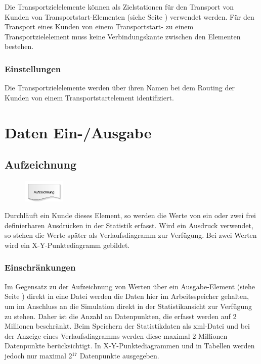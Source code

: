 Die Transportzielelemente können als Zielstationen für den Transport von Kunden von
Transportstart-Elementen (siehe Seite \pageref{ref:ModelElementTransportSource}) verwendet werden.
Für den Transport eines Kunden von einem Transportstart- zu einem Transportzielelement
muss keine Verbindungskante zwischen den Elementen bestehen.

\subsection*{Einstellungen}

Die Transportzielelemente werden über ihren Namen bei dem Routing der Kunden von
einem Transportstartelement identifiziert.





\chapter{Daten Ein-/Ausgabe}

\section{Aufzeichnung}
\label{ref:ModelElementRecord}

\begin{figure}
\vspace{-22pt}
\includegraphics[width=2cm]{imageModelElementRecord.png}
\vspace{-22pt}
\end{figure}

Durchläuft ein Kunde dieses Element, so werden die Werte von ein oder zwei frei definierbaren Ausdrücken
in der Statistik erfasst. Wird ein Ausdruck verwendet, so stehen die Werte später als Verlaufsdiagramm
zur Verfügung. Bei zwei Werten wird ein X-Y-Punktediagramm gebildet.

\subsection*{Einschränkungen}

Im Gegensatz zu der Aufzeichnung von Werten über ein Ausgabe-Element (siehe Seite \pageref{ref:ModelElementOutput}) 
direkt in eine Datei werden die Daten hier im Arbeitsspeicher gehalten, um im Anschluss an die Simulation
direkt in der Statistikansicht zur Verfügung zu stehen. Daher ist die Anzahl an Datenpunkten, die erfasst
werden auf 2 Millionen beschränkt. Beim Speichern der Statistikdaten als xml-Datei und bei der Anzeige eines
Verlaufsdiagramms werden diese maximal 2 Millionen Datenpunkte berücksichtigt. In X-Y-Punktediagrammen und
in Tabellen werden jedoch nur maximal 2$^{17}$ Datenpunkte ausgegeben.


